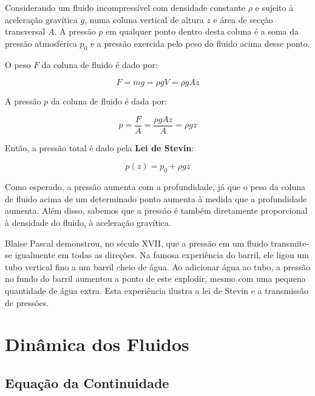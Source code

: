 Considerando um fluido incompressível com densidade constante \( \rho \) e sujeito à aceleração gravítica \( g \), numa coluna vertical de altura \( z \) e área de secção transversal \( A \). A pressão \( p \) em qualquer ponto dentro desta coluna é a soma da pressão atmosférica \( p_0 \) e a pressão exercida pelo peso do fluido acima desse ponto.

O peso \( F \) da coluna de fluido é dado por:

\begin{equation*}
    F = m g = \rho g V = \rho g A z
\end{equation*}

A pressão \( p \) da coluna de fluido é dada por:

\begin{equation*}
    p = \frac{F}{A} = \frac{\rho g A z}{A} = \rho g z
\end{equation*}

Então, a pressão total é dado pela \textbf{Lei de Stevin}:

\begin{equation}
    p(z) = p_0 + \rho g z
\end{equation}

Como esperado, a pressão aumenta com a profundidade, já que o peso da coluna de fluido acima de um determinado ponto aumenta à medida que a profundidade aumenta. Além disso, sabemos que a pressão é também diretamente proporcional à densidade do fluido, à aceleração gravítica.

\begin{historybox}

Blaise Pascal demonstrou, no século XVII, que a pressão em um fluido transmite-se igualmente em todas as direções. Na famosa experiência do barril, ele ligou um tubo vertical fino a um barril cheio de água. Ao adicionar água ao tubo, a pressão no fundo do barril aumentou a ponto de este explodir, mesmo com uma pequena quantidade de água extra. Esta experiência ilustra a lei de Stevin e a transmissão de pressões.

\end{historybox}


\section{Dinâmica dos Fluidos}

\subsection{Equação da Continuidade}

